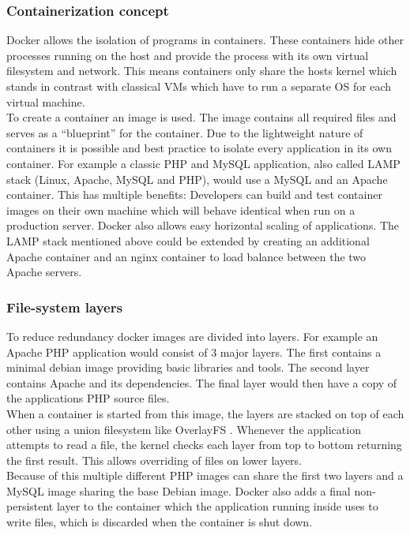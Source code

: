 \documentclass[conference,compsoc,final,a4paper]{IEEEtran}
\begin{document}
\subsubsection*{Containerization concept}
Docker allows the isolation of programs in containers. These containers hide other processes running on the host and provide the process with its own virtual filesystem and network. This means containers only share the hosts kernel which stands in contrast with classical VMs which have to run a separate OS for each virtual machine. \cite{bernstein2014containers}\\
To create a container an image is used. The image contains all required files and serves as a \enquote{blueprint} for the container. \cite{bernstein2014containers} Due to the lightweight nature of containers it is possible and best practice to isolate every application in its own container. \cite{dockerBestPractices} For example a classic PHP and MySQL application, also called LAMP stack (Linux, Apache, MySQL and PHP), would use a MySQL and an Apache container. This has multiple benefits: Developers can build and test container images on their own machine which will behave identical when run on a production server. Docker also allows easy horizontal scaling of applications. The LAMP stack mentioned above could be extended by creating an additional Apache container and an nginx container to load balance between the two Apache servers.
\subsubsection*{File-system layers}
To reduce redundancy docker images are divided into layers. \cite{dockerBestPractices} For example an Apache PHP application would consist of 3 major layers. The first contains a minimal debian image providing basic libraries and tools. The second layer contains Apache and its dependencies. The final layer would then have a copy of the applications PHP source files. \\
When a container is started from this image, the layers are stacked on top of each other using a union filesystem like OverlayFS \cite{overlayfs}. Whenever the application attempts to read a file, the kernel checks each layer from top to bottom returning the first result. This allows overriding of files on lower layers. \\
Because of this multiple different PHP images can share the first two layers and a MySQL image sharing the base Debian image. Docker also adds a final non-persistent layer to the container which the application running inside uses to write files, which is discarded when the container is shut down.
\end{document}

